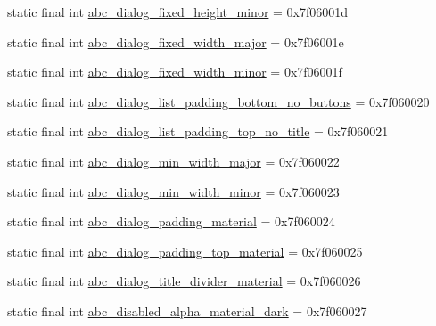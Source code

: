 \begin{DoxyCompactItemize}
static final int \mbox{\hyperlink{classandroid_1_1support_1_1v7_1_1appcompat_1_1_r_1_1dimen_a415efc1c1c01dc944b8b147483840fad}{abc\+\_\+dialog\+\_\+fixed\+\_\+height\+\_\+minor}} = 0x7f06001d
\item 
static final int \mbox{\hyperlink{classandroid_1_1support_1_1v7_1_1appcompat_1_1_r_1_1dimen_ad7f6e116c04d41cc7d5d1f9bf0e4038b}{abc\+\_\+dialog\+\_\+fixed\+\_\+width\+\_\+major}} = 0x7f06001e
\item 
static final int \mbox{\hyperlink{classandroid_1_1support_1_1v7_1_1appcompat_1_1_r_1_1dimen_ad07ecaf57a71a1c011ce1210ede9172f}{abc\+\_\+dialog\+\_\+fixed\+\_\+width\+\_\+minor}} = 0x7f06001f
\item 
static final int \mbox{\hyperlink{classandroid_1_1support_1_1v7_1_1appcompat_1_1_r_1_1dimen_ab6eb7cc44d3b3567eddb0926f8ecf55e}{abc\+\_\+dialog\+\_\+list\+\_\+padding\+\_\+bottom\+\_\+no\+\_\+buttons}} = 0x7f060020
\item 
static final int \mbox{\hyperlink{classandroid_1_1support_1_1v7_1_1appcompat_1_1_r_1_1dimen_a6855c6c40caa3ecd4488943c4a92ec3f}{abc\+\_\+dialog\+\_\+list\+\_\+padding\+\_\+top\+\_\+no\+\_\+title}} = 0x7f060021
\item 
static final int \mbox{\hyperlink{classandroid_1_1support_1_1v7_1_1appcompat_1_1_r_1_1dimen_abfb57f4c014c07b7c96b531d47074c89}{abc\+\_\+dialog\+\_\+min\+\_\+width\+\_\+major}} = 0x7f060022
\item 
static final int \mbox{\hyperlink{classandroid_1_1support_1_1v7_1_1appcompat_1_1_r_1_1dimen_ab83da246a302d81238b96aa8902849d5}{abc\+\_\+dialog\+\_\+min\+\_\+width\+\_\+minor}} = 0x7f060023
\item 
static final int \mbox{\hyperlink{classandroid_1_1support_1_1v7_1_1appcompat_1_1_r_1_1dimen_ad1288246c4d8bb4e2586275198e17cf2}{abc\+\_\+dialog\+\_\+padding\+\_\+material}} = 0x7f060024
\item 
static final int \mbox{\hyperlink{classandroid_1_1support_1_1v7_1_1appcompat_1_1_r_1_1dimen_a679ac16cbd922ac7f229594ceef4692a}{abc\+\_\+dialog\+\_\+padding\+\_\+top\+\_\+material}} = 0x7f060025
\item 
static final int \mbox{\hyperlink{classandroid_1_1support_1_1v7_1_1appcompat_1_1_r_1_1dimen_a838daf05d2e6842cb670ded036a9649d}{abc\+\_\+dialog\+\_\+title\+\_\+divider\+\_\+material}} = 0x7f060026
\item 
static final int \mbox{\hyperlink{classandroid_1_1support_1_1v7_1_1appcompat_1_1_r_1_1dimen_af692674ee9dd6bfe88f44b3abf41b713}{abc\+\_\+disabled\+\_\+alpha\+\_\+material\+\_\+dark}} = 0x7f060027

\end{DoxyCompactItemize}
